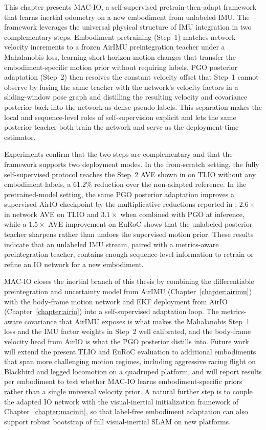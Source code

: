 This chapter presents MAC-IO, a self-supervised pretrain-then-adapt framework that learns inertial odometry on a new embodiment from unlabeled IMU.
The framework leverages the universal physical structure of IMU integration in two complementary steps.
Embodiment pretraining (Step~1) matches network velocity increments to a frozen AirIMU preintegration teacher under a Mahalanobis loss, learning short-horizon motion changes that transfer the embodiment-specific motion prior without requiring labels.
PGO posterior adaptation (Step~2) then resolves the constant velocity offset that Step~1 cannot observe by fusing the same teacher with the network's velocity factors in a sliding-window pose graph and distilling the resulting velocity and covariance posterior back into the network as dense pseudo-labels.
This separation makes the local and sequence-level roles of self-supervision explicit and lets the same posterior teacher both train the network and serve as the deployment-time estimator.

Experiments confirm that the two steps are complementary and that the framework supports two deployment modes.
In the from-scratch setting, the fully self-supervised protocol reaches the Step~2 AVE shown in  on TLIO without any embodiment labels, a $61.2\%$ reduction over the non-adapted reference.
In the pretrained-model setting, the same PGO posterior adaptation improves a supervised AirIO checkpoint by the multiplicative reductions reported in : $2.6\times$ in network AVE on TLIO and $3.1\times$ when combined with PGO at inference, while a $1.5\times$ AVE improvement on EuRoC shows that the unlabeled posterior teacher sharpens rather than undoes the supervised motion prior.
These results indicate that an unlabeled IMU stream, paired with a metrics-aware preintegration teacher, contains enough sequence-level information to retrain or refine an IO network for a new embodiment.

MAC-IO closes the inertial branch of this thesis by combining the differentiable preintegration and uncertainty model from AirIMU (Chapter~\ref{chapter:airimu}) with the body-frame motion network and EKF deployment from AirIO (Chapter~\ref{chapter:airio}) into a self-supervised adaptation loop.
The metrics-aware covariance that AirIMU exposes is what makes the Mahalanobis Step~1 loss and the IMU factor weights in Step~2 well calibrated, and the body-frame velocity head from AirIO is what the PGO posterior distills into.
Future work will extend the present TLIO and EuRoC evaluation to additional embodiments that span more challenging motion regimes, including aggressive racing flight on Blackbird and legged locomotion on a quadruped platform, and will report results per embodiment to test whether MAC-IO learns embodiment-specific priors rather than a single universal velocity prior.
A natural further step is to couple the adapted IO network with the visual-inertial initialization framework of Chapter~\ref{chapter:macinit}, so that label-free embodiment adaptation can also support robust bootstrap of full visual-inertial SLAM on new platforms.

